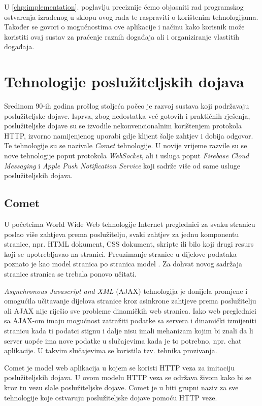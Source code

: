 \documentclass[times, utf8, zavrsni]{fer}
\begin{document}
U \ref{chp:implementation}. poglavlju preciznije ćemo objasniti rad programskog ostvarenja izrađenog u sklopu ovog rada te raspraviti o korištenim tehnologijama. Također se govori o mogućnostima ove aplikacije i načinu kako korisnik može koristiti ovaj sustav za praćenje raznih događaja ali i organiziranje vlastitih događaja.

\chapter{Tehnologije poslužiteljskih dojava}
\label{chp:technologies}

Sredinom 90-ih godina prošlog stoljeća počeo je razvoj sustava koji podržavaju poslužiteljske dojave. Isprva, zbog nedostatka već gotovih i praktičnih rješenja, poslužiteljske dojave su se izvodile nekonvencionalnim korištenjem protokola HTTP, izvorno namijenjenog uporabi gdje klijent šalje zahtjev i dobija odgovor. Te tehnologije su se nazivale {\em Comet} tehnologije. U novije vrijeme razvile su se nove tehnologije poput protokola {\em WebSocket}, ali i usluga poput {\em Firebase Cloud Messaging} i {\em Apple Push Notification Service} koji sadrže više od same usluge poslužiteljskih dojava.

\section{Comet}
U početcima World Wide Web tehnologije Internet preglednici za svaku stranicu poslao više zahtjeva prema poslužitelju, svaki zahtjev za jednu komponentu stranice, npr. HTML dokument, CSS dokument, skripte ili bilo koji drugi resurs koji se upotrebljavao na stranici. Preuzimanje stranice u dijelove podataka poznato je kao model stranica po stranica model . Za dohvat novog sadržaja stranice stranica se trebala ponovo učitati.

{\em Asynchronous Javascript and XML} (AJAX) tehnologija je donijela promjene i omogućila učitavanje dijelova stranice kroz asinkrone zahtjeve prema poslužitelju ali AJAX nije riješio sve probleme dinamičkih web stranica. Iako web preglednici sa AJAX-om imaju mogućnost zatražiti podatke sa servera i dinamički izmijeniti stranicu kada ti podatci stignu i dalje nisu imali mehanizam kojim bi znali da li server uopće ima nove podatke u slučajevima kada je to potrebno, npr. chat aplikacije. U takvim slučajevima se koristila tzv. tehnika prozivanja.\citep{gravelle2009comet}

Comet je model web aplikacija u kojem se koristi HTTP veza za imitaciju poslužiteljskih dojava. U ovom modelu HTTP veza se održava živom kako bi se kroz tu vezu slale poslužiteljske dojave. Comet je u biti grupni naziv za sve tehnologije koje ostvaruju poslužiteljske dojave pomoću HTTP veze.
\end{document}
